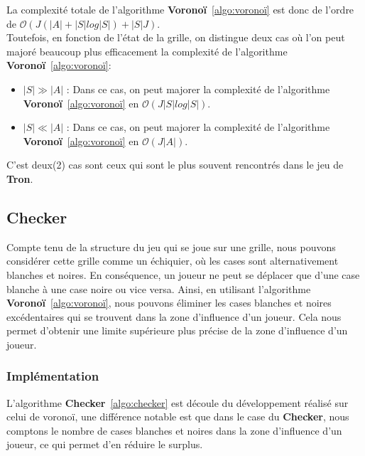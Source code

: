 La complexité totale de l'algorithme \textbf{Voronoï}~\ref{algo:voronoï} est donc de l'ordre de $\mathcal{O}{(J(|A| + |S|log|S|) + |S|J)}$.\\

Toutefois, en fonction de l'état de la grille, on distingue deux cas où l'on peut majoré beaucoup plus efficacement la complexité de l'algorithme \textbf{Voronoï}~\ref{algo:voronoï}:
\begin{itemize}
	\item $|S| \gg |A|$ : Dans ce cas, on peut majorer la complexité de l'algorithme \textbf{Voronoï}~\ref{algo:voronoï} en $\mathcal{O}{(J|S|log|S|)}$.
	\item $|S| \ll |A|$ : Dans ce cas, on peut majorer la complexité de l'algorithme \textbf{Voronoï}~\ref{algo:voronoï} en $\mathcal{O}{(J|A|)}$.
\end{itemize}
C'est deux(2) cas sont ceux qui sont le plus souvent rencontrés dans le jeu de \textbf{Tron}.\\

\subsection{Checker}
Compte tenu de la structure du jeu qui se joue sur une grille, nous pouvons considérer cette grille comme un échiquier, où les cases sont alternativement 
blanches et noires. En conséquence, un joueur ne peut se déplacer que d'une case blanche à une case noire ou vice versa. Ainsi, en utilisant l'algorithme 
\textbf{Voronoï}~\ref{algo:voronoï}, nous pouvons éliminer les cases blanches et noires excédentaires qui se trouvent dans la zone d'influence d'un joueur. 
Cela nous permet d'obtenir une limite supérieure plus précise de la zone d'influence d'un joueur.

\tocless\subsubsection{Implémentation}
L'algorithme \textbf{Checker}~\ref{algo:checker} est découle du développement réalisé sur celui de voronoï, une différence notable est que dans le case 
du \textbf{Checker}, nous comptons le nombre de cases blanches et noires dans la zone d'influence d'un joueur, ce qui permet d'en réduire le surplus.\\

